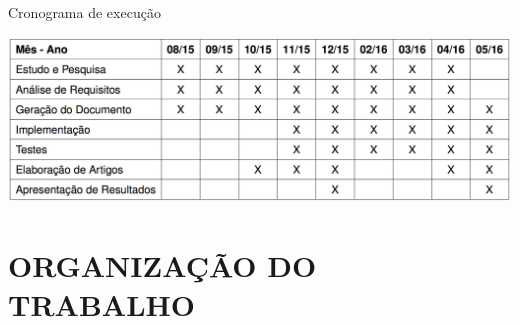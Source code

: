 \renewcommand{\arraystretch}{1.5}


\begin{table}[h!]
	\centering
	\caption{Cronograma de execução}
	\includegraphics[width=1\textwidth]{Cap1/imagens/tabela}
	\label{tabela01}
\end{table}


\section{ORGANIZAÇÃO DO TRABALHO}\label{sec:organizacao-trabalho}

